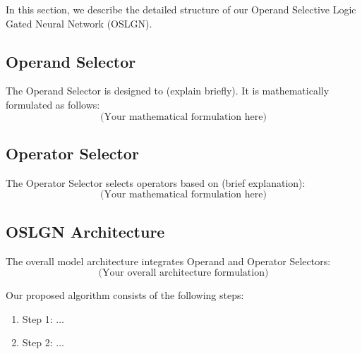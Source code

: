 In this section, we describe the detailed structure of our Operand Selective Logic Gated Neural Network (OSLGN).

\subsection{Operand Selector}
The Operand Selector is designed to (explain briefly). It is mathematically formulated as follows:
\[
\text{(Your mathematical formulation here)}
\]

\subsection{Operator Selector}
The Operator Selector selects operators based on (brief explanation):
\[
\text{(Your mathematical formulation here)}
\]

\subsection{OSLGN Architecture}
The overall model architecture integrates Operand and Operator Selectors:
\[
\text{(Your overall architecture formulation)}
\]

Our proposed algorithm consists of the following steps:

\begin{enumerate}
    \item Step 1: ...
    \item Step 2: ...
\end{enumerate}
